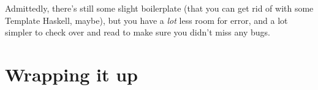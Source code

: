\documentclass[]{article}
\begin{document}
Admittedly, there's still some slight boilerplate (that you can get rid
of with some Template Haskell, maybe), but you have a \emph{lot} less
room for error, and a lot simpler to check over and read to make sure
you didn't miss any bugs.

\section{Wrapping it up}\label{wrapping-it-up}
\end{document}
